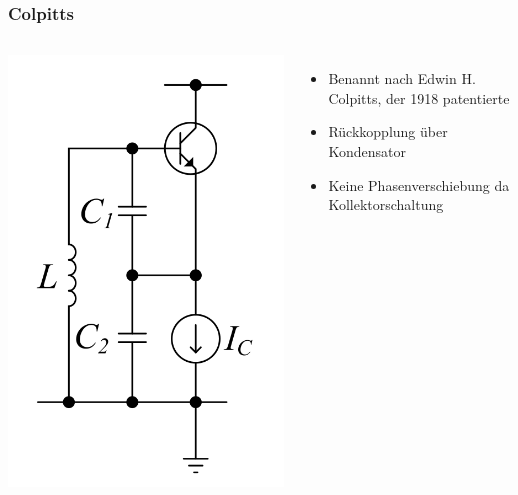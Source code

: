 \begin{frame}
    \frametitle{Colpitts}
    \begin{columns}
        \begin{center}
	  \includegraphics[width=\textwidth,height=.85\textheight,keepaspectratio]{a07/Cc_colp2.png} \\[1em]
	\end{center}
     	\begin{itemize}
			\item Benannt nach Edwin H. Colpitts, der 1918 patentierte
			\item Rückkopplung über Kondensator
			\item Keine Phasenverschiebung da Kollektorschaltung
    	\end{itemize}
      \end{columns}
\end{frame}

